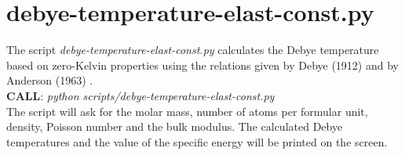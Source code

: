 %
\section{debye-temperature-elast-const.py}
The script \emph{debye-temperature-elast-const.py} calculates the Debye temperature based on zero-Kelvin properties using the relations given by Debye (1912) \cite{Debye1912} and by Anderson (1963) \cite{Anderson1963}.\\

\textbf{CALL}: \emph{python scripts/debye-temperature-elast-const.py}\\

The script will ask for the molar mass, number of atoms per formular unit, density, Poisson number and the bulk modulus. The calculated Debye temperatures and the value of the specific energy will be printed on the screen.
